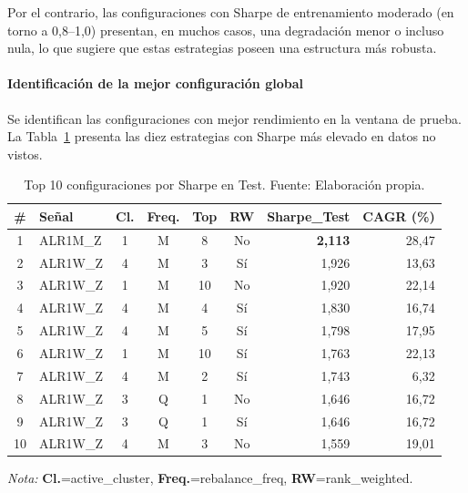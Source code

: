 Por el contrario, las configuraciones con Sharpe de entrenamiento
moderado (en torno a 0,8--1,0) presentan, en muchos casos, una
degradación menor o incluso nula, lo que sugiere que estas
estrategias poseen una estructura más robusta.

\paragraph{Identificación de la mejor configuración global}

Se identifican las
configuraciones con mejor rendimiento en la ventana de prueba.
La Tabla~\ref{tab:top10_oos} presenta las diez estrategias con
Sharpe más elevado en datos no vistos.

\begin{table}[H]
\centering
\small
\begin{tabular}{clccccrr}
\toprule
\textbf{\#} & \textbf{Señal} & \textbf{Cl.} & \textbf{Freq.} & \textbf{Top} &
\textbf{RW} & \textbf{Sharpe\_Test} & \textbf{CAGR (\%)} \\
\midrule
1  & ALR1M\_Z    & 1 & M  & 8  & No  & \textbf{2,113} & 28,47 \\
2  & ALR1W\_Z    & 4 & M  & 3  & Sí  & 1,926         & 13,63 \\
3  & ALR1W\_Z    & 1 & M  & 10 & No  & 1,920         & 22,14 \\
4  & ALR1W\_Z    & 4 & M  & 4  & Sí  & 1,830         & 16,74 \\
5  & ALR1W\_Z    & 4 & M  & 5  & Sí  & 1,798         & 17,95 \\
6  & ALR1W\_Z    & 1 & M  & 10 & Sí  & 1,763         & 22,13 \\
7  & ALR1W\_Z    & 4 & M  & 2  & Sí  & 1,743         & 6,32  \\
8  & ALR1W\_Z    & 3 & Q  & 1  & No  & 1,646         & 16,72 \\
9  & ALR1W\_Z    & 3 & Q  & 1  & Sí  & 1,646         & 16,72 \\
10 & ALR1W\_Z    & 4 & M  & 3  & No  & 1,559         & 19,01 \\
\bottomrule
\end{tabular}
\caption{Top 10 configuraciones por Sharpe en Test.
Fuente: Elaboración propia.}
\label{tab:top10_oos}
\begin{flushleft}
\small \textit{Nota:} \textbf{Cl.}=active\_cluster,
\textbf{Freq.}=rebalance\_freq, \textbf{RW}=rank\_weighted.
\end{flushleft}
\end{table}

